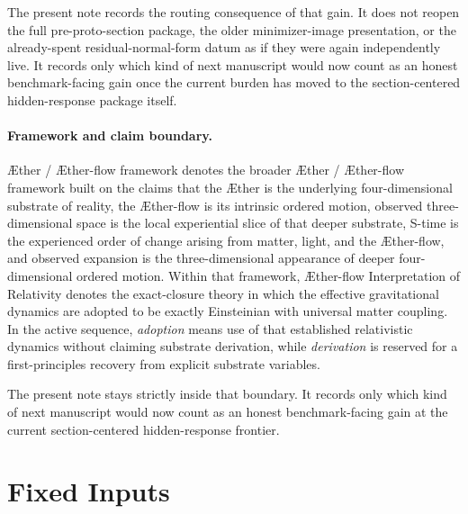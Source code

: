 \documentclass[11pt]{article}
\newcommand{\Aether}{\AE{}ther}
\newcommand{\Aflow}{\AE{}ther-flow}
\newcommand{\TheoryName}{\Aflow{} Interpretation of Relativity}
\newcommand{\TheoryProgram}{\Aether{} / \Aflow{} framework}
\begin{document}
The present note records the routing consequence of that gain. It does not reopen the full pre-proto-section package, the older minimizer-image presentation, or the already-spent residual-normal-form datum as if they were again independently live. It records only which kind of next manuscript would now count as an honest benchmark-facing gain once the current burden has moved to the section-centered hidden-response package itself.

\paragraph{Framework and claim boundary.}
\TheoryProgram{} denotes the broader \Aether{} / \Aflow{} framework built on the claims that the \Aether{} is the underlying four-dimensional substrate of reality, the \Aflow{} is its intrinsic ordered motion, observed three-dimensional space is the local experiential slice of that deeper substrate, S-time is the experienced order of change arising from matter, light, and the \Aflow{}, and observed expansion is the three-dimensional appearance of deeper four-dimensional ordered motion. Within that framework, \TheoryName{} denotes the exact-closure theory in which the effective gravitational dynamics are adopted to be exactly Einsteinian with universal matter coupling. In the active sequence, \emph{adoption} means use of that established relativistic dynamics without claiming substrate derivation, while \emph{derivation} is reserved for a first-principles recovery from explicit substrate variables.

The present note stays strictly inside that boundary. It records only which kind of next manuscript would now count as an honest benchmark-facing gain at the current section-centered hidden-response frontier.

\section{Fixed Inputs}
\end{document}
